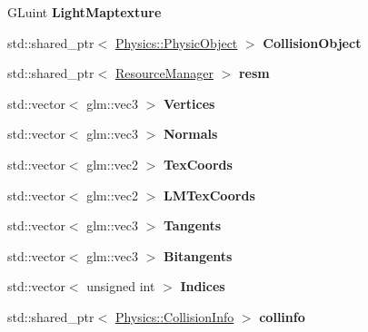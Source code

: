 \begin{DoxyCompactItemize}
\item 
G\+Luint {\bfseries Light\+Maptexture}\hypertarget{class_b_s_p_face_aba7ea1972d5bd877c6e7221d2d44a518}{}\label{class_b_s_p_face_aba7ea1972d5bd877c6e7221d2d44a518}

\item 
std\+::shared\+\_\+ptr$<$ \hyperlink{class_physics_1_1_physic_object}{Physics\+::\+Physic\+Object} $>$ {\bfseries Collision\+Object}\hypertarget{class_b_s_p_face_a3911b146eb7a30813599dd9ef28147e1}{}\label{class_b_s_p_face_a3911b146eb7a30813599dd9ef28147e1}

\item 
std\+::shared\+\_\+ptr$<$ \hyperlink{class_resource_manager}{Resource\+Manager} $>$ {\bfseries resm}\hypertarget{class_b_s_p_face_a1b8547089bd3fa796772777b426fe916}{}\label{class_b_s_p_face_a1b8547089bd3fa796772777b426fe916}

\item 
std\+::vector$<$ glm\+::vec3 $>$ {\bfseries Vertices}\hypertarget{class_b_s_p_face_af5c2081505af9ca68f2fd11411accc61}{}\label{class_b_s_p_face_af5c2081505af9ca68f2fd11411accc61}

\item 
std\+::vector$<$ glm\+::vec3 $>$ {\bfseries Normals}\hypertarget{class_b_s_p_face_a007702ba00244c56eaddd574c1101f94}{}\label{class_b_s_p_face_a007702ba00244c56eaddd574c1101f94}

\item 
std\+::vector$<$ glm\+::vec2 $>$ {\bfseries Tex\+Coords}\hypertarget{class_b_s_p_face_a732af8bbae1f7d05d6f208c5483b2097}{}\label{class_b_s_p_face_a732af8bbae1f7d05d6f208c5483b2097}

\item 
std\+::vector$<$ glm\+::vec2 $>$ {\bfseries L\+M\+Tex\+Coords}\hypertarget{class_b_s_p_face_acd850892f1a001b8c323648508c0357d}{}\label{class_b_s_p_face_acd850892f1a001b8c323648508c0357d}

\item 
std\+::vector$<$ glm\+::vec3 $>$ {\bfseries Tangents}\hypertarget{class_b_s_p_face_a7914de0eca3b3a656f2e5af1f989f270}{}\label{class_b_s_p_face_a7914de0eca3b3a656f2e5af1f989f270}

\item 
std\+::vector$<$ glm\+::vec3 $>$ {\bfseries Bitangents}\hypertarget{class_b_s_p_face_addc72ce0baed9dc6e61c802271de9503}{}\label{class_b_s_p_face_addc72ce0baed9dc6e61c802271de9503}

\item 
std\+::vector$<$ unsigned int $>$ {\bfseries Indices}\hypertarget{class_b_s_p_face_a5d53336515838573d7d619622664e51a}{}\label{class_b_s_p_face_a5d53336515838573d7d619622664e51a}

\item 
std\+::shared\+\_\+ptr$<$ \hyperlink{class_physics_1_1_collision_info}{Physics\+::\+Collision\+Info} $>$ {\bfseries collinfo}\hypertarget{class_b_s_p_face_acf76591e8fdb71bb1390a0685652ead9}{}\label{class_b_s_p_face_acf76591e8fdb71bb1390a0685652ead9}

\end{DoxyCompactItemize}


